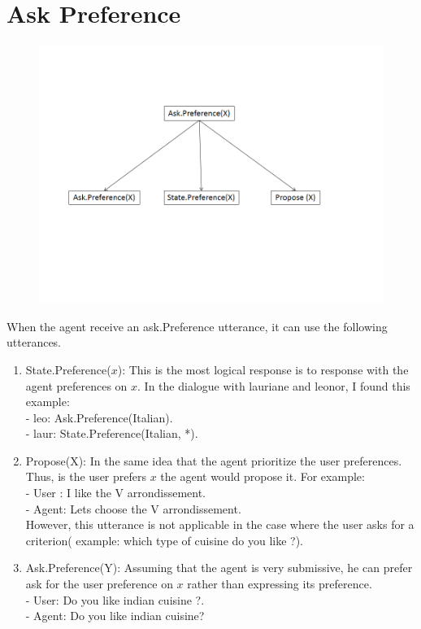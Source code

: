 \documentclass{llncs}
\begin{document}
\section{Ask Preference}

\begin{figure}
\centerline{\includegraphics[width=5in]{figs/ask.PNG}}

\end{figure}

When the agent receive an ask.Preference utterance, it can use the following utterances.
 \begin{enumerate}
 \item State.Preference($x$): This is the most logical response is to response with the agent preferences on $x$. In the dialogue with lauriane and leonor, I found this example:  
 \\ - leo: Ask.Preference(Italian).
 \\ - laur: State.Preference(Italian, *). 
 
 \item Propose(X): In the same idea that the agent prioritize the user preferences. Thus, is the user prefers $x$ the agent would propose it. 
 For example:
 \\- User : I like the V arrondissement.
 \\- Agent: Lets choose the V arrondissement. 
 \\ However, this utterance is not applicable in the case where the user asks for a criterion( example: which type of cuisine do you like ?).
 
 \item Ask.Preference(Y): Assuming that the agent is very submissive, he can prefer ask for the user preference on $x$ rather than expressing its preference.
 \\ - User: Do you like indian cuisine ?.
 \\ - Agent: Do you like indian cuisine? 
 \end{enumerate}
\end{document}
